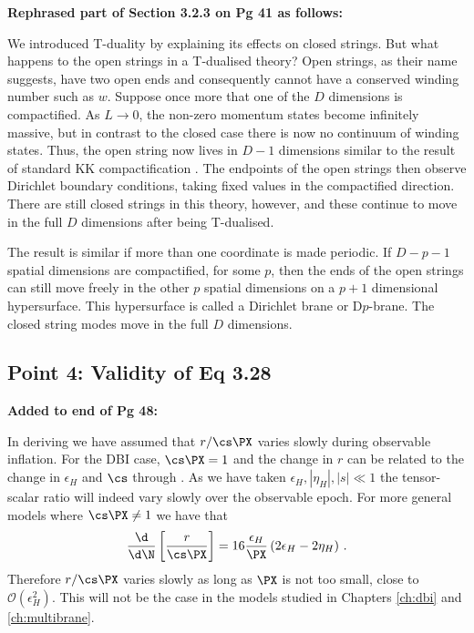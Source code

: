 \textbf{Rephrased part of Section 3.2.3 on Pg 41 as follows:}

We introduced T-duality by explaining
its effects on closed strings. But what happens to the open strings in a T-dualised theory? Open
strings, as their name suggests, have two open ends and
consequently cannot have a conserved winding number such as $w$. Suppose once more
that one
of the $D$ dimensions is compactified. As $L\rightarrow0$, the non-zero momentum
states become infinitely massive, but in contrast to the closed case there is now
no continuum of winding states. Thus, the open string now lives in $D-1$ dimensions
similar to the result of standard KK compactification \cite{Johnson2000}.
The endpoints of the open strings 
then observe Dirichlet boundary conditions, taking fixed values in the compactified
direction.
There are still closed strings in this theory, however, and these continue to
move in the full $D$ dimensions after being T-dualised.  

The result is similar if more than
one coordinate is made periodic.
If $D-p-1$ spatial dimensions are compactified, for some $p$, then the ends of
the open
strings can still move freely in the other $p$ spatial dimensions on a $p+1$
dimensional hypersurface. This hypersurface is called a Dirichlet brane or
D$p$-brane. The closed string modes move in the full $D$ dimensions.



\subsection{Point 4: Validity of Eq 3.28}
\textbf{Added to end of Pg 48:}

In deriving  we have assumed that $r/\cs \PX$ varies slowly during
observable inflation. For the DBI case, $\cs \PX = 1$ and the change in $r$ can be related to the
change in $\epsilon_H$ and $\cs$ through . As we have taken $\epsilon_H,
|\eta_H|,|s|\ll 1$ the tensor-scalar ratio will indeed vary slowly over the observable epoch.
% 
For more general models where $\cs \PX \ne 1$ we have that
% 
\begin{equation}
 \frac{\d }{\d \N}\left[ \frac{r}{\cs \PX}\right] = 16\frac{\epsilon_H}{\PX}\left( 2\epsilon_H
-2\eta_H\right)\,.
\end{equation}
% 
Therefore $r/\cs\PX$ varies slowly as long as $\PX$ is not too small, \iec close to
$\mathcal{O}(\epsilon_H^2)$. This will not be the case in the models studied in Chapters
\ref{ch:dbi} and \ref{ch:multibrane}.

